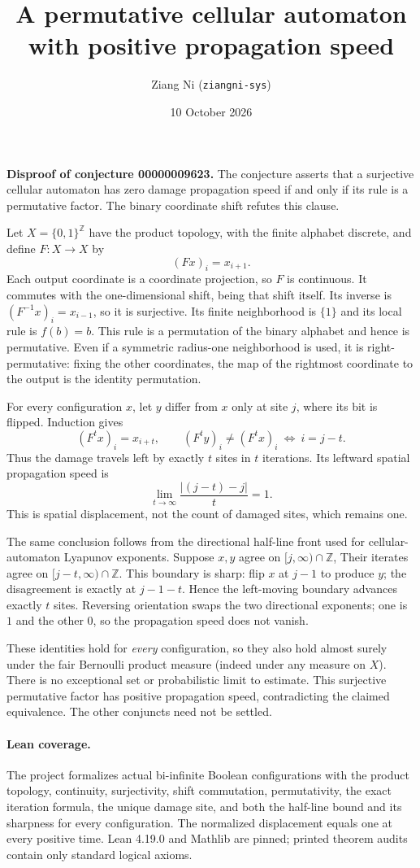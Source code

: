 \documentclass[11pt]{article}
\title{A permutative cellular automaton with positive propagation speed}
\author{Ziang Ni (\texttt{ziangni-sys})}
\date{10 October 2026}
\begin{document}
\maketitle
\noindent\textbf{Disproof of conjecture 00000009623.}
The conjecture asserts that a surjective cellular automaton has zero
damage propagation speed if and only if its rule is a permutative
factor. The binary coordinate shift refutes this clause.

Let $X=\{0,1\}^{\mathbb Z}$ have the product topology, with the finite
alphabet discrete, and define $F:X\to X$ by
\[
 (Fx)_i=x_{i+1}.
\]
Each output coordinate is a coordinate projection, so $F$ is continuous.
It commutes with the one-dimensional shift, being that shift itself.
Its inverse is $(F^{-1}x)_i=x_{i-1}$, so it is surjective. Its finite
neighborhood is $\{1\}$ and its local rule is $f(b)=b$. This rule is a
permutation of the binary alphabet and hence is permutative. Even if a
symmetric radius-one neighborhood is used, it is right-permutative:
fixing the other coordinates, the map of the rightmost coordinate to
the output is the identity permutation.

For every configuration $x$, let $y$ differ from $x$ only at site $j$,
where its bit is flipped. Induction gives
\[
 (F^t x)_i=x_{i+t},\qquad
 (F^t y)_i\ne(F^t x)_i\ \Longleftrightarrow\ i=j-t.
\]
Thus the damage travels left by exactly $t$ sites in $t$ iterations.
Its leftward spatial propagation speed is
\[
 \lim_{t\to\infty}\frac{|(j-t)-j|}{t}=1.
\]
This is spatial displacement, not the count of damaged sites, which
remains one.

The same conclusion follows from the directional half-line front
used for cellular-automaton Lyapunov exponents. Suppose $x,y$ agree on
$[j,\infty)\cap\mathbb Z$, Their iterates agree on
$[j-t,\infty)\cap\mathbb Z$. This boundary is sharp: flip $x$ at
$j-1$ to produce $y$; the disagreement is exactly at $j-1-t$.
Hence the left-moving boundary advances exactly $t$ sites. Reversing
orientation swaps the two directional exponents; one is $1$ and the
other $0$, so the propagation speed does not vanish.

These identities hold for \emph{every} configuration, so they also
hold almost surely under the fair Bernoulli product measure (indeed
under any measure on $X$). There is no exceptional set or probabilistic
limit to estimate. This surjective permutative factor has positive
propagation speed, contradicting the claimed equivalence. The other
conjuncts need not be settled.

\paragraph{Lean coverage.}
The project formalizes actual bi-infinite Boolean configurations with
the product topology, continuity, surjectivity, shift commutation,
permutativity, the exact iteration formula, the unique damage site,
and both the half-line bound and its sharpness for every configuration.
The normalized displacement equals one at every positive time.
Lean 4.19.0 and Mathlib are pinned; printed theorem audits contain only
standard logical axioms.
\end{document}
